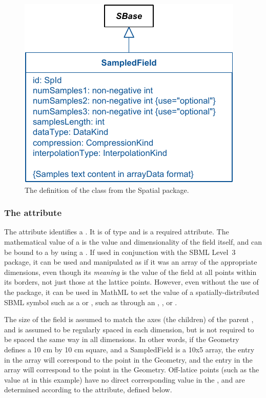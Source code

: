 \begin{figure}[ht]
  \includegraphics{figs/SampledField-uml}
  \caption{The definition of the \SampledField class from the Spatial package.}
  \label{sampledfield-uml}
\end{figure}

\subsubsection{The \fixttspace{} attribute}
The  attribute identifies a \SampledField.  It is of type  and is a required attribute.  The mathematical value of a \SampledField is the value and dimensionality of the field itself, and can be bound to a \Parameter by using a \SpatialSymbolReference.  If used in conjunction with the SBML Level~3  package, it can be used and manipulated as if it was an array of the appropriate dimensions, even though its \emph{meaning} is the value of the field at all points within its borders, not just those at the lattice points.  However, even without the use of the  package, it can be used in \sbmlthreecore MathML to set the value of a spatially-distributed SBML symbol such as a \Species or \Parameter, such as through an \InitialAssignment, \Rule, or \EventAssignment.

The size of the field is assumed to match the axes (the \CoordinateComponent children) of the parent \Geometry, and is assumed to be regularly spaced in each dimension, but is not required to be spaced the same way in all dimensions.  In other words, if the Geometry defines a 10 cm by 10 cm square, and a SampledField is a 10x5 array, the \val{[0,0]} entry in the array will correspond to the point  in the Geometry, and the \val{[10,5]} entry in the array will correspond to the point  in the Geometry.  Off-latice points (such as the value at  in this example) have no direct corresponding value in the \SampledField, and are determined according to the  attribute, defined below.

